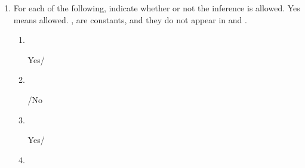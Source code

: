 
\begin{enumerate}
 \setlength{\leftmarginii}{1em}
 \setlength{\leftmarginiii}{0.1em}

 \item For each of the following, indicate whether or not the inference is 
  allowed.  Yes means allowed. ,  are constants, and they do not 
  appear in \p{\Gamma} and \p{\Delta}.

  \begin{enumerate}

   \item ~ 

\begin{argumentN}[1]




\end{argumentN}

\dotfill Yes/

\item ~


\begin{argumentN}[1]



\end{argumentN}

\dotfill {}/No

\item ~
 \begin{argumentN}[1]




\end{argumentN}

\dotfill Yes/

\item ~

\begin{argumentN}[1]



\end{argumentN}
\end{enumerate}
\end{enumerate}
